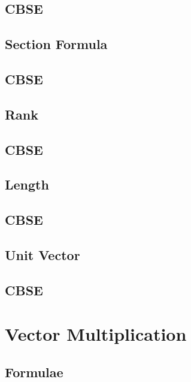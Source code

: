 \documentclass[journal]{IEEEtran}
\begin{document}
\subsection{CBSE}

%
\subsection{Section Formula}

\subsection{CBSE}

\subsection{Rank}

\subsection{CBSE}

\subsection{Length}

\subsection{CBSE}

\subsection{Unit Vector}

\subsection{CBSE}

%
%
\newpage
\section{Vector Multiplication}
\subsection{Formulae}

\end{document}
